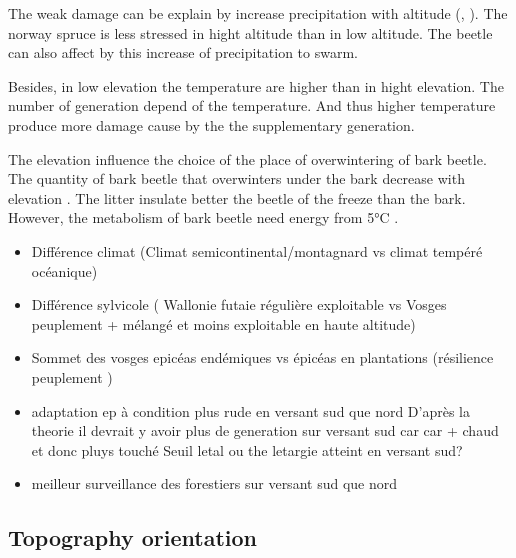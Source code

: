 \documentclass[3p,procedia]{elsarticle}
\begin{document}
The weak damage can be explain by increase precipitation with altitude (\cite{kotlarski_elevation_2012}, \cite{Roe_orographic_preicpitation_2005}).
The norway spruce is less stressed in hight altitude than in low altitude. 
The beetle can also affect by this increase of precipitation to swarm. 

Besides, in low elevation the temperature are higher than in hight elevation. 
The number of generation depend of the temperature.
And thus higher temperature produce more damage cause by the the supplementary generation. 

The elevation influence the choice of the place of overwintering of  bark beetle.
The quantity of bark beetle that overwinters under the bark decrease with elevation \citep{kasumovic_overwintering_2019}.
The litter insulate better the beetle of the freeze \citep{lombardero_cold_2000} than the bark.
However, the metabolism of bark beetle need energy from 5°C  \citep{kostal_physiological_2011}.





\begin{itemize}
	\item Différence climat (Climat semicontinental/montagnard vs climat tempéré océanique)
	\item Différence sylvicole ( Wallonie futaie régulière exploitable vs Vosges peuplement + mélangé et moins exploitable en haute altitude)
	\item Sommet des vosges epicéas endémiques vs épicéas en plantations (résilience peuplement )
	\item adaptation ep à condition plus rude en versant sud que nord 
	D'après la theorie il devrait y avoir plus de generation sur versant sud car car + chaud et donc pluys touché
	Seuil letal ou the letargie atteint en versant sud?
\item meilleur surveillance des forestiers sur versant sud que nord 
	
\end{itemize}

\subsection{Topography orientation}

\end{document}
